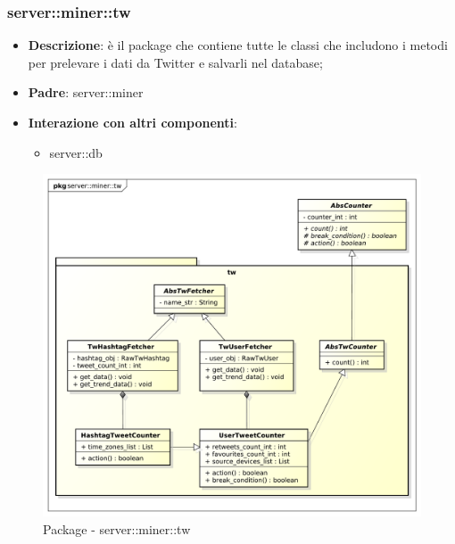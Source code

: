 \subsubsection{server::miner::tw} %
\label{ssub:bdsm_app_server_miner_tw}

\begin{itemize}
  \item \textbf{Descrizione}: è il package che contiene tutte le classi che includono i metodi per prelevare i dati da Twitter e salvarli nel database;
  \item \textbf{Padre}: server::miner
  \item \textbf{Interazione con altri componenti}:
  	\begin{itemize}
  		\item server::db
  	\end{itemize}
\end{itemize}

	\begin{figure}[!htbp]
		\centering
		\centerline{\includegraphics[scale=0.5]{./images/server/miner_tw.pdf}}
		\caption{Package - server::miner::tw}
	\end{figure}

